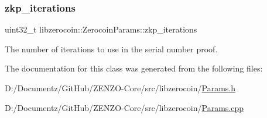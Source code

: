 \subsubsection{\texorpdfstring{zkp\_iterations}{zkp\_iterations}}
{\footnotesize\ttfamily uint32\+\_\+t libzerocoin\+::\+Zerocoin\+Params\+::zkp\+\_\+iterations}

The number of iterations to use in the serial number proof. 

The documentation for this class was generated from the following files\+:\begin{DoxyCompactItemize}
\item 
D\+:/\+Documentz/\+Git\+Hub/\+Z\+E\+N\+Z\+O-\/\+Core/src/libzerocoin/\mbox{\hyperlink{_params_8h}{Params.\+h}}\item 
D\+:/\+Documentz/\+Git\+Hub/\+Z\+E\+N\+Z\+O-\/\+Core/src/libzerocoin/\mbox{\hyperlink{_params_8cpp}{Params.\+cpp}}\end{DoxyCompactItemize}
